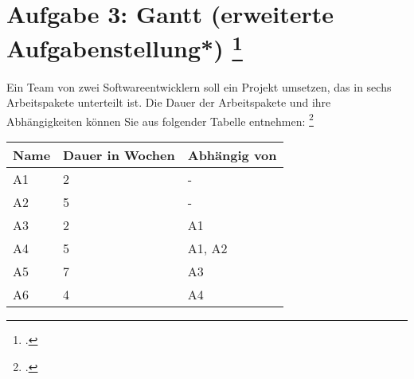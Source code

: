 \documentclass{lehramt-informatik-aufgabe}
\begin{document}
\let\f=\footnotesize
\let\FZ=\liCpmFruehesterI
\let\SZ=\liCpmSpaetesterI
\let\v=\liCpmVon
\let\vz=\liCpmVonZu
\let\z=\liCpmZu


\section{Aufgabe 3: Gantt (erweiterte Aufgabenstellung*)
\footcite[Seite 2]{sosy:ab:5}}

Ein Team von zwei Softwareentwicklern soll ein Projekt umsetzen, das in
sechs Arbeitspakete unterteilt ist. Die Dauer der Arbeitspakete und ihre
Abhängigkeiten können Sie aus folgender Tabelle entnehmen:
\footcite[Thema 2 Teilaufgabe 1 Aufgabe 1]{examen:66116:2018:09}

\begin{center}
\begin{tabular}{|l|l|l|}
\hline
Name & Dauer in Wochen & Abhängig von\\\hline\hline
A1 & 2 & - \\\hline
A2 & 5 & - \\\hline
A3 & 2 & A1 \\\hline
A4 & 5 & A1, A2 \\\hline
A5 & 7 & A3 \\\hline
A6 & 4 & A4 \\\hline
\end{tabular}
\end{center}
\end{document}
